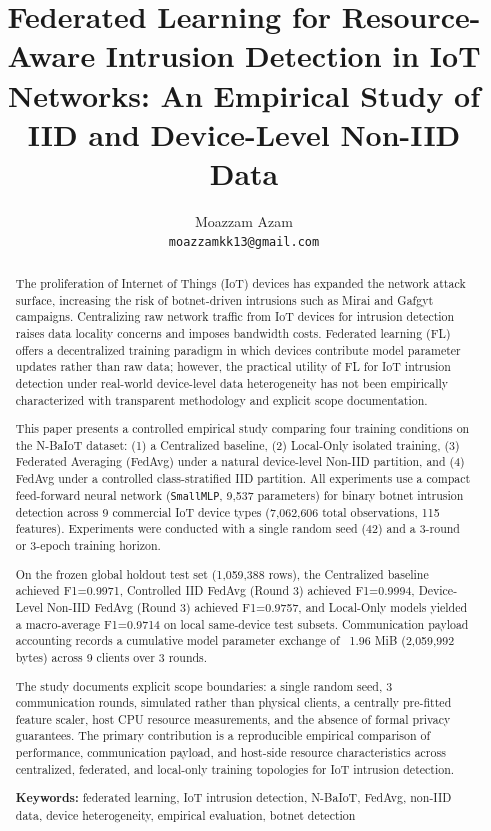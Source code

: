 \documentclass[11pt,a4paper]{article}
\title{\textbf{Federated Learning for Resource-Aware Intrusion Detection in IoT Networks: An Empirical Study of IID and Device-Level Non-IID Data}}
\author{Moazzam Azam \\ \texttt{moazzamkk13@gmail.com}}
\date{}
\begin{document}
\maketitle

\begin{abstract}
The proliferation of Internet of Things (IoT) devices has expanded the network attack surface, increasing the risk of botnet-driven intrusions such as Mirai and Gafgyt campaigns. Centralizing raw network traffic from IoT devices for intrusion detection raises data locality concerns and imposes bandwidth costs. Federated learning (FL) offers a decentralized training paradigm in which devices contribute model parameter updates rather than raw data; however, the practical utility of FL for IoT intrusion detection under real-world device-level data heterogeneity has not been empirically characterized with transparent methodology and explicit scope documentation.

This paper presents a controlled empirical study comparing four training conditions on the N-BaIoT dataset: (1) a Centralized baseline, (2) Local-Only isolated training, (3) Federated Averaging (FedAvg) under a natural device-level Non-IID partition, and (4) FedAvg under a controlled class-stratified IID partition. All experiments use a compact feed-forward neural network (\texttt{SmallMLP}, 9,537 parameters) for binary botnet intrusion detection across 9 commercial IoT device types (7,062,606 total observations, 115 features). Experiments were conducted with a single random seed (42) and a 3-round or 3-epoch training horizon.

On the frozen global holdout test set (1,059,388 rows), the Centralized baseline achieved F1=0.9971, Controlled IID FedAvg (Round 3) achieved F1=0.9994, Device-Level Non-IID FedAvg (Round 3) achieved F1=0.9757, and Local-Only models yielded a macro-average F1=0.9714 on local same-device test subsets. Communication payload accounting records a cumulative model parameter exchange of ~1.96 MiB (2,059,992 bytes) across 9 clients over 3 rounds.

The study documents explicit scope boundaries: a single random seed, 3 communication rounds, simulated rather than physical clients, a centrally pre-fitted feature scaler, host CPU resource measurements, and the absence of formal privacy guarantees. The primary contribution is a reproducible empirical comparison of performance, communication payload, and host-side resource characteristics across centralized, federated, and local-only training topologies for IoT intrusion detection.

\textbf{Keywords:} federated learning, IoT intrusion detection, N-BaIoT, FedAvg, non-IID data, device heterogeneity, empirical evaluation, botnet detection
\end{abstract}
\end{document}
